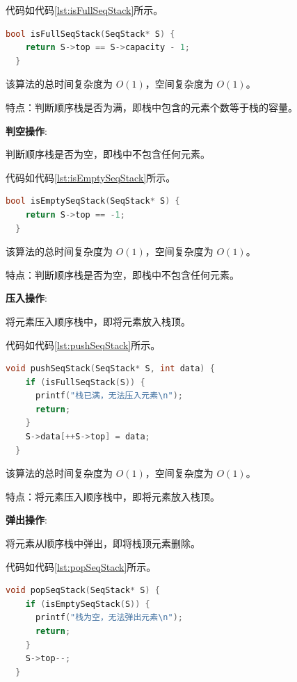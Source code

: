 \documentclass[lang=cn,newtx,10pt,scheme=chinese]{../elegantbook}
\begin{document}
代码如代码\ref{lst:isFullSeqStack}所示。

\begin{lstlisting}[language=C++, caption={判断顺序栈是否为满示例代码}, label={lst:isFullSeqStack}]
  bool isFullSeqStack(SeqStack* S) {
    return S->top == S->capacity - 1;
  }

\end{lstlisting}

该算法的总时间复杂度为 $O(1)$，空间复杂度为 $O(1)$。

特点：判断顺序栈是否为满，即栈中包含的元素个数等于栈的容量。

\textbf{判空操作}:

判断顺序栈是否为空，即栈中不包含任何元素。

代码如代码\ref{lst:isEmptySeqStack}所示。

\begin{lstlisting}[language=C++, caption={判断顺序栈是否为空示例代码}, label={lst:isEmptySeqStack}]
  bool isEmptySeqStack(SeqStack* S) {
    return S->top == -1;
  }

\end{lstlisting}

该算法的总时间复杂度为 $O(1)$，空间复杂度为 $O(1)$。

特点：判断顺序栈是否为空，即栈中不包含任何元素。

\textbf{压入操作}:

将元素压入顺序栈中，即将元素放入栈顶。

代码如代码\ref{lst:pushSeqStack}所示。

\begin{lstlisting}[language=C++, caption={压入顺序栈示例代码}, label={lst:pushSeqStack}]
  void pushSeqStack(SeqStack* S, int data) {
    if (isFullSeqStack(S)) {
      printf("栈已满，无法压入元素\n");
      return;
    }
    S->data[++S->top] = data;
  }

\end{lstlisting}

该算法的总时间复杂度为 $O(1)$，空间复杂度为 $O(1)$。

特点：将元素压入顺序栈中，即将元素放入栈顶。

\textbf{弹出操作}:

将元素从顺序栈中弹出，即将栈顶元素删除。

代码如代码\ref{lst:popSeqStack}所示。

\begin{lstlisting}[language=C++, caption={弹出顺序栈示例代码}, label={lst:popSeqStack}]
  void popSeqStack(SeqStack* S) {
    if (isEmptySeqStack(S)) {
      printf("栈为空，无法弹出元素\n");
      return;
    }
    S->top--;
  }

\end{lstlisting}
\end{document}

